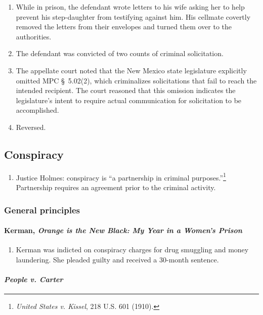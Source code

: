 \begin{enumerate}
    \item While in prison, the defendant wrote letters to his wife asking her 
    to help prevent his step-daughter from testifying against him. His 
    cellmate covertly removed the letters from their envelopes and turned them 
    over to the authorities.
    \item The defendant was convicted of two counts of criminal solicitation.
    \item The appellate court noted that the New Mexico state legislature 
    explicitly omitted MPC \S\ 5.02(2), which criminalizes solicitations that 
    fail to reach the intended recipient. The court reasoned that this 
    omission indicates the legislature's intent to require actual 
    communication for solicitation to be accomplished.
    \item Reversed.
\end{enumerate}

\subsection{Conspiracy}

\begin{enumerate}
    \item Justice Holmes: conspiracy is ``a partnership in criminal 
    purposes.''\footnote{\emph{United States v. Kissel}, 218 U.S. 601 (1910).} 
    Partnership requires an agreement prior to the criminal activity.
\end{enumerate}

\subsubsection{General principles}

\paragraph{Kerman, \emph{Orange is the New Black: My Year in a Women's 
Prison}}

\begin{enumerate}
    \item Kerman was indicted on conspiracy charges for drug smuggling and 
    money laundering. She pleaded guilty and received a 30-month sentence.
\end{enumerate}

\paragraph{\emph{People v. Carter}}

